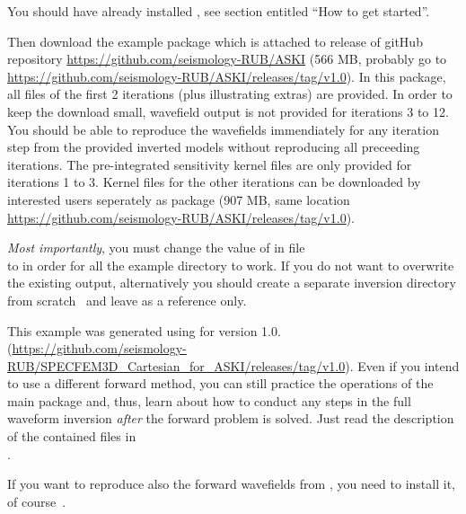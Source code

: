 You should have already installed \ASKI{}, see section entitled ``How to get started''. 

Then download the example
package  which is attached to release  
of gitHub repository \url{https://github.com/seismology-RUB/ASKI} (566 MB, probably go to 
\url{https://github.com/seismology-RUB/ASKI/releases/tag/v1.0}).
In this package, all files of the first 2 iterations (plus illustrating extras) are provided. 
In order to keep the download small, wavefield output is not provided  for
iterations 3 to 12. You should be able to reproduce the wavefields immendiately for any iteration step
from the provided inverted models without reproducing all preceeding iterations. 
The pre-integrated sensitivity kernel files are only provided for
iterations 1 to 3. Kernel files for the other iterations can be downloaded by
interested users seperately as package 
(907 MB, same location \url{https://github.com/seismology-RUB/ASKI/releases/tag/v1.0}).

\emph{Most importantly}, you must change the value of 
in file\\
 to
 in order for all the example directory to work. 
If you do not want to overwrite the existing output, alternatively you 
should create a separate inversion directory from scratch~
 and leave 
as a reference only. 

This example was generated using  for \ASKI{} version 1.0.
(\url{https://github.com/seismology-RUB/SPECFEM3D_Cartesian_for_ASKI/releases/tag/v1.0}).
Even if you intend
to use a different forward method, you can still practice the operations of the main \ASKI{}
package and, thus, learn about how to conduct any steps in
the full waveform inversion \emph{after} the forward problem is solved. Just read the description
of the contained files in \\
.

If you want to reproduce also the forward wavefields from , 
you need to install it, of course~.
%
%
\newpage
